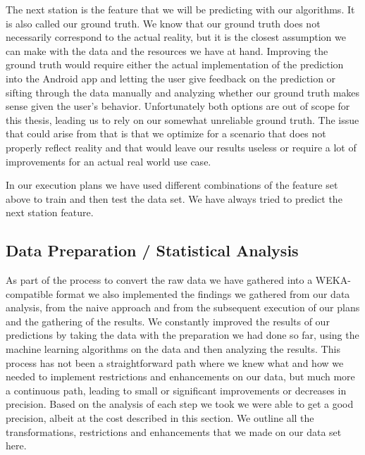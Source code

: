 The next station is the feature that we will be predicting with our algorithms. It is also called our ground truth. We know that our ground truth does not necessarily correspond to the actual reality, but it is the closest assumption we can make with the data and the resources we have at hand. Improving the ground truth would require either the actual implementation of the prediction into the Android app and letting the user give feedback on the prediction or sifting through the data manually and analyzing whether our ground truth makes sense given the user's behavior. Unfortunately both options are out of scope for this thesis, leading us to rely on our somewhat unreliable ground truth. The issue that could arise from that is that we optimize for a scenario that does not properly reflect reality and that would leave our results useless or require a lot of improvements for an actual real world use case.

In our execution plans we have used different combinations of the feature set above to train and then test the data set. We have always tried to predict the next station feature.


\subsection{Data Preparation / Statistical Analysis}
\label{subsec:data_preparation}
As part of the process to convert the raw data we have gathered into a WEKA-compatible format we also implemented the findings we gathered from our data analysis, from the naive approach and from the subsequent execution of our plans and the gathering of the results. We constantly improved the results of our predictions by taking the data with the preparation we had done so far, using the machine learning algorithms on the data and then analyzing the results. This process has not been a straightforward path where we knew what and how we needed to implement restrictions and enhancements on our data, but much more a continuous path, leading to small or significant improvements or decreases in precision. Based on the analysis of each step we took we were able to get a good precision, albeit at the cost described in this section. We outline all the transformations, restrictions and enhancements that we made on our data set here.

